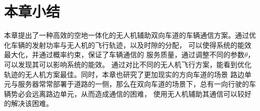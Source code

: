 \section{本章小结}\label{section4-6}
本章提出了一种高效的空地一体化的无人机辅助双向车道的车辆通信方案。通过优化车辆的发射功率与无人机的飞行轨迹，以及时隙的分配，
可以使得系统的能效最大化，并通过概率约束，保证了车辆通信的 服务质量，通过调整不同的参数$\theta$，可以发现其可以影响系统的能效。
通过对比不同的无人机飞行方案，能看到优化轨迹的无人机方案最佳。同时，本章也研究了更加现实的方向车道的场景
路边单元与服务器常常部署于道路的一侧，那么在双向车道的场景下，总有一向行驶的车辆势必会远离路边单元，从而造成通信的困难，
使用无人机辅助其通信可以较好的解决该困难。

